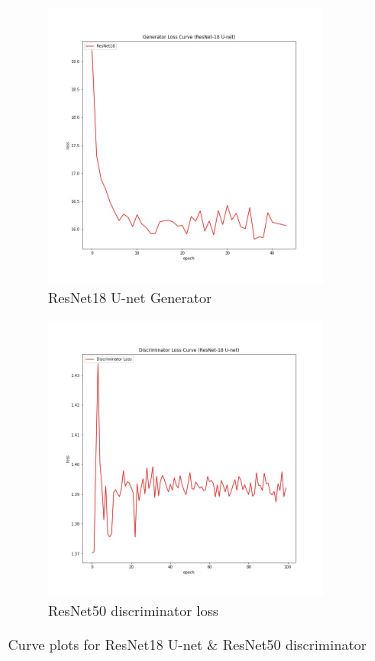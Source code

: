 \documentclass[10pt,twocolumn,letterpaper]{article}
\begin{document}
    \begin{figure}[!htb]
    	\centering
    	\begin{subfigure}[b]{0.2\textwidth}
    		\centering
    		\includegraphics[width=0.8\textwidth]{figures/resnet18_generator_loss}
    		\caption{ResNet18 U-net Generator}
    		\label{fig: resnet_loss}
    	\end{subfigure}
    		\hspace{0.1 in}
    	\begin{subfigure}[b]{0.2\textwidth}
    		\centering
    		\includegraphics[width=0.8\textwidth]{figures/resnet18_discriminator_loss}
    		\caption{ResNet50 discriminator loss}
    		\label{fig: resnet50_disc_loss}
    	\end{subfigure}
    	\caption{Curve plots for ResNet18 U-net \& ResNet50 discriminator}
    	\label{fig: resnet18_curves}
    \end{figure}
\end{document}
